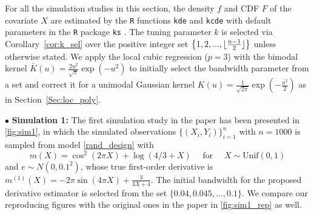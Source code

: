 \documentclass{uwstat572}
\theoremstyle{definition}
\DeclarePairedDelimiter\floor{\lfloor}{\rfloor}
\theoremstyle{theorem}
\begin{document}
For all the simulation studies in this section, the density $f$ and CDF $F$ of the covariate $X$ are estimated by the \texttt{R} functions \texttt{kde} and \texttt{kcde} with default parameters in the \texttt{R} package \texttt{ks} \citep{ks2022R}. The tuning parameter $k$ is selected via Corollary~\ref{cor:k_sel} over the positive integer set $\left\{1,2,...,\floor{\frac{n-1}{2}}\right\}$ unless otherwise stated. We apply the local cubic regression ($p=3$) with the bimodal kernel $\bar{K}(u)=\frac{2u^2}{\sqrt{\pi}} \exp\left(-u^2\right)$ to initially select the bandwidth parameter from a set and correct it for a unimodal Gaussian kernel $K(u)=\frac{1}{\sqrt{2\pi}} \exp\left(-\frac{u^2}{2}\right)$ as in Section~\ref{Sec:loc_poly}.

\indent $\bullet$ {\bf Simulation 1:} The first simulation study in the paper \citep{liu2020smoothed} has been presented in \autoref{fig:sim1}, in which the simulated observations $\{(X_i,Y_i)\}_{i=1}^n$ with $n=1000$ is sampled from model \eqref{rand_design} with
\begin{equation}
\label{sim1_eq}
m(X) = \cos^2(2\pi X) + \log(4/3 +X) \quad \text{ for } \quad X\sim \mathrm{Unif}(0,1)
\end{equation}
and $e\sim N(0,0.1^2)$, whose true first-order derivative is $m^{(1)}(X)=-2\pi \sin(4\pi X) + \frac{3}{3X+4}$. The initial bandwidth for the proposed derivative estimator is selected from the set $\{0.04, 0.045,...,0.1\}$. We compare our reproducing figures with the original ones in the paper in \autoref{fig:sim1_rep} as well.
\end{document}
